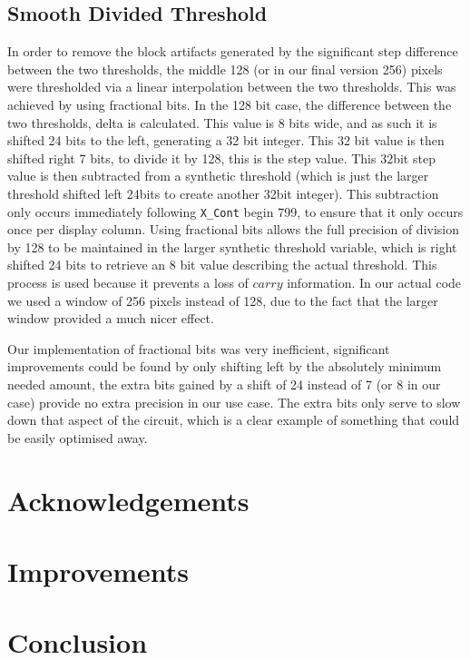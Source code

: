 \documentclass[12pt]{article}
\begin{document}
  \subsection{Smooth Divided Threshold}
  In order to remove the block artifacts generated by the significant step difference between the two thresholds, the middle 128 (or in our final version 256) pixels were thresholded via a linear interpolation between the two thresholds. This was achieved by using fractional bits. In the 128 bit case, the difference between the two thresholds, delta is calculated. This value is 8 bits wide, and as such it is shifted 24 bits to the left, generating a 32 bit integer. This 32 bit value is then shifted right 7 bits, to divide it by 128, this is the step value. This 32bit step value is then subtracted from a synthetic threshold (which is just the larger threshold shifted left 24bits to create another 32bit integer). This subtraction only occurs immediately following \texttt{X\_Cont} begin 799, to ensure that it only occurs once per display column. Using fractional bits allows the full precision of division by 128 to be maintained in the larger synthetic threshold variable, which is right shifted 24 bits to retrieve an 8 bit value describing the actual threshold. This process is used because it prevents a loss of \(carry\) information. In our actual code we used a window of 256 pixels instead of 128, due to the fact that the larger window provided a much nicer effect.

  Our implementation of fractional bits was very inefficient, significant improvements could be found by only shifting left by the absolutely minimum needed amount, the extra bits gained by a shift of 24 instead of 7 (or 8 in our case) provide no extra precision in our use case. The extra bits only serve to slow down that aspect of the circuit, which is a clear example of something that could be easily optimised away.
  
  \section{Acknowledgements}
  
  \section{Improvements}
  
  \section{Conclusion}
  
\end{document}
